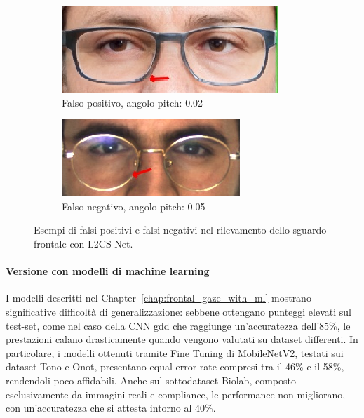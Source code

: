 \documentclass[12pt,a4paper,openright,twoside]{book}
\begin{document}
\begin{figure}[htbp]
    \centering
    \begin{subfigure}{0.49\textwidth}
        \includegraphics[width=.7\linewidth]{figures/frontal-gaze-l2cs-false-positive-97-1.png}
        \caption{Falso positivo, angolo pitch: 0.02}
        \label{fig:frontal_gaze_l2cs_false_positive}
    \end{subfigure}
    \hfill
    \begin{subfigure}{0.49\textwidth}
        \includegraphics[width=.7\linewidth]{figures/frontal-gaze-l2cs-false-negative-65-1.png}
        \caption{Falso negativo, angolo pitch: 0.05}
        \label{fig:frontal_gaze_l2cs_false_negative}
    \end{subfigure}
    \caption{Esempi di falsi positivi e falsi negativi nel rilevamento dello sguardo frontale con L2CS-Net.}
    \label{fig:frontal_gaze_l2cs_weakness}
\end{figure}

\paragraph{Versione con modelli di machine learning}
I modelli descritti nel Chapter~\ref{chap:frontal_gaze_with_ml} mostrano significative difficoltà di generalizzazione: sebbene ottengano punteggi elevati sul test-set, come nel caso della CNN gdd che raggiunge un'accuratezza dell'85\%, le prestazioni calano drasticamente quando vengono valutati su dataset differenti. In particolare, i modelli ottenuti tramite Fine Tuning di MobileNetV2, testati sui dataset Tono e Onot, presentano equal error rate compresi tra il 46\% e il 58\%, rendendoli poco affidabili. Anche sul sottodataset Biolab, composto esclusivamente da immagini reali e compliance, le performance non migliorano, con un'accuratezza che si attesta intorno al 40\%.
\end{document}
